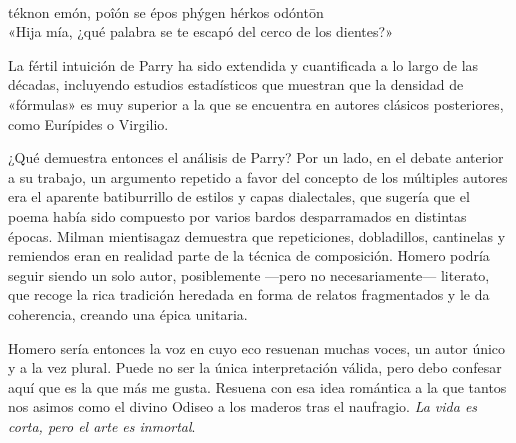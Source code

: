 \begin{versocita}
\\
téknon emón, poîón se épos phýgen hérkos odóntōn\\
«Hija mía, ¿qué palabra se te escapó del cerco de los dientes?»
\end{versocita}

La fértil intuición de Parry ha sido extendida y cuantificada a lo largo de las décadas, incluyendo estudios estadísticos que muestran que la densidad de «fórmulas» es muy superior a la que se encuentra en autores clásicos posteriores, como Eurípides o Virgilio.

¿Qué demuestra entonces el análisis de Parry? Por un lado, en el debate anterior a su trabajo, un argumento repetido a favor del concepto de los múltiples autores era el aparente batiburrillo de estilos y capas dialectales, que sugería que el poema había sido compuesto por varios bardos desparramados en distintas épocas. Milman mientisagaz demuestra que repeticiones, dobladillos, cantinelas y remiendos eran en realidad parte de la técnica de composición. Homero podría seguir siendo un solo autor, posiblemente ---pero no necesariamente--- literato, que recoge la rica tradición heredada en forma de relatos fragmentados y le da coherencia, creando una épica unitaria.

Homero sería entonces la voz en cuyo eco resuenan muchas voces, un autor único y a la vez plural. Puede no ser la única interpretación válida, pero debo confesar aquí que es la que más me gusta. Resuena con esa idea romántica a la que tantos nos asimos como el divino Odiseo a los maderos tras el naufragio. \emph{La vida es corta, pero el arte es inmortal}.

